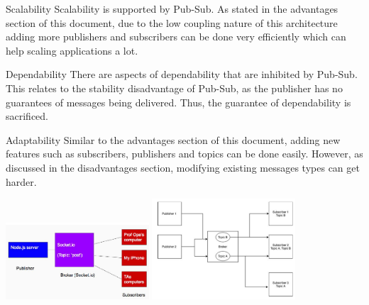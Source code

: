 \begin{nfps}
\item[Scalability] Scalability is supported by Pub-Sub. As stated in the
    advantages section of this document, due to the low coupling nature of this
    architecture adding more publishers and subscribers can be done very
    efficiently which can help scaling applications a lot.
\item[Dependability] There are aspects of dependability that are inhibited by
    Pub-Sub. This relates to the stability disadvantage of Pub-Sub, as the
    publisher has no guarantees of messages being delivered. Thus, the
    guarantee of dependability is sacrificed.
\item[Adaptability] Similar to the advantages section of this document, adding
    new features such as subscribers, publishers and topics can be done easily.
    However, as discussed in the disadvantages section, modifying existing
    messages types can get harder.
\end{nfps}

\begin{center}
    \includegraphics[width=0.4\textwidth]{./pub-sub1}
    \includegraphics[width=0.4\textwidth]{./pub-sub2}
\end{center}
